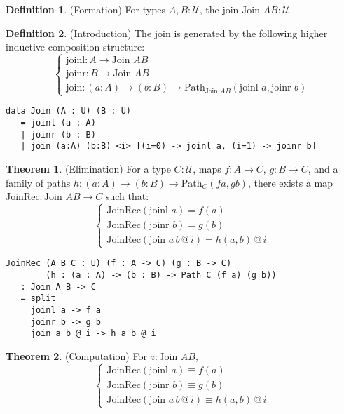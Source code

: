 \documentclass{article}
\theoremstyle{definition}
\newtheorem{theorem}{Theorem}
\newtheorem{definition}{Definition}
\begin{document}
\begin{definition} (Formation)
For types $A, B : \mathcal{U}$, the join $\text{Join } A B : \mathcal{U}$.
\end{definition}

\begin{definition} (Introduction)
The join is generated by the following higher inductive composition structure:
\[
\begin{cases}
\text{joinl} : A \to \text{Join } A B \\
\text{joinr} : B \to \text{Join } A B \\
\text{join} : (a : A) \to (b : B) \to \text{Path}_{\text{Join } A B} (\text{joinl } a, \text{joinr } b)
\end{cases}
\]
\begin{lstlisting}
data Join (A : U) (B : U)
   = joinl (a : A)
   | joinr (b : B)
   | join (a:A) (b:B) <i> [(i=0) -> joinl a, (i=1) -> joinr b]
\end{lstlisting}
\end{definition}

\begin{theorem} (Elimination)
For a type $C : \mathcal{U}$, maps $f : A \to C$, $g : B \to C$,
and a family of paths $h : (a : A) \to (b : B) \to \text{Path}_C (f a, g b)$,
there exists a map $\text{JoinRec} : \text{Join } A B \to C$ such that:
\[
\begin{cases}
\text{JoinRec}(\text{joinl } a) = f(a) \\
\text{JoinRec}(\text{joinr } b) = g(b) \\
\text{JoinRec}(\text{join } a \, b \, @ \, i) = h(a, b) \, @ \, i
\end{cases}
\]
\begin{lstlisting}
JoinRec (A B C : U) (f : A -> C) (g : B -> C)
        (h : (a : A) -> (b : B) -> Path C (f a) (g b))
   : Join A B -> C
   = split
     joinl a -> f a
     joinr b -> g b
     join a b @ i -> h a b @ i
\end{lstlisting}
\end{theorem}

\begin{theorem} (Computation)
For $z : \text{Join } A B$,
\[
\begin{cases}
\text{JoinRec}(\text{joinl } a) \equiv f(a) \\
\text{JoinRec}(\text{joinr } b) \equiv g(b) \\
\text{JoinRec}(\text{join } a \, b \, @ \, i) \equiv h(a, b) \, @ \, i
\end{cases}
\]
\end{theorem}
\end{document}
